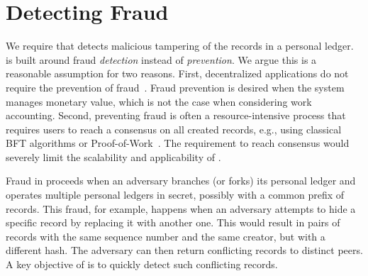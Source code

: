 \section{Detecting Fraud}
\label{sec:detecting_fraud}
We require that \ModelName{} detects malicious tampering of the records in a personal ledger.
\ModelName{} is built around fraud \emph{detection} instead of \emph{prevention}.
We argue this is a reasonable assumption for two reasons.
First, decentralized applications do not require the prevention of fraud~\cite{krishnan2002virtual}.
Fraud prevention is desired when the system manages monetary value, which is not the case when considering work accounting.
Second, preventing fraud is often a resource-intensive process that requires users to reach a consensus on all created records, e.g., using classical BFT algorithms or Proof-of-Work~\cite{vukolic2015quest}.
The requirement to reach consensus would severely limit the scalability and applicability of \ModelName{}.

Fraud in \ModelName{} proceeds when an adversary branches (or forks) its personal ledger and operates multiple personal ledgers in secret, possibly with a common prefix of records.
This fraud, for example, happens when an adversary attempts to hide a specific record by replacing it with another one.
This would result in pairs of records with the same sequence number and the same creator, but with a different hash.
The adversary can then return conflicting records to distinct peers.
A key objective of \ModelName{} is to quickly detect such conflicting records.



